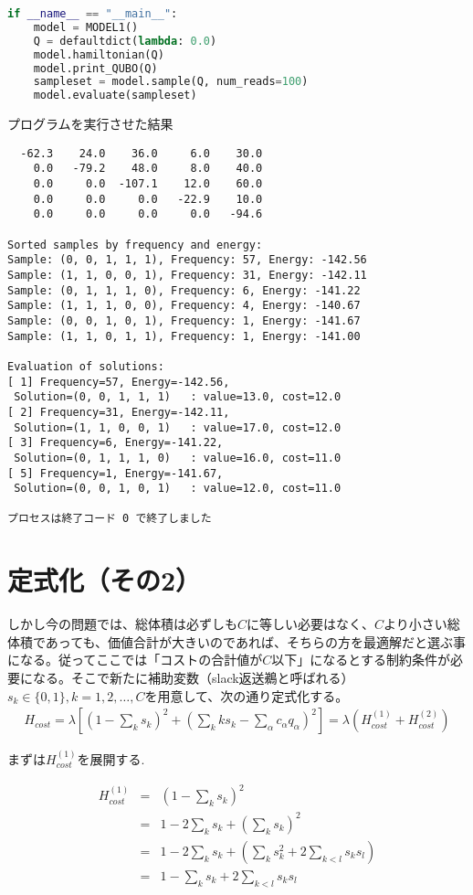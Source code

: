 \documentclass[uplatex,dvipdfmx,a4paper,11pt,oneside,openany]{jsbook}
\begin{document}
\begin{lstlisting}[language=Python]
if __name__ == "__main__":
    model = MODEL1()
    Q = defaultdict(lambda: 0.0)
    model.hamiltonian(Q)
    model.print_QUBO(Q)
    sampleset = model.sample(Q, num_reads=100)
    model.evaluate(sampleset)
\end{lstlisting}

プログラムを実行させた結果

\begin{verbatim}
  -62.3    24.0    36.0     6.0    30.0
    0.0   -79.2    48.0     8.0    40.0
    0.0     0.0  -107.1    12.0    60.0
    0.0     0.0     0.0   -22.9    10.0
    0.0     0.0     0.0     0.0   -94.6

Sorted samples by frequency and energy:
Sample: (0, 0, 1, 1, 1), Frequency: 57, Energy: -142.56
Sample: (1, 1, 0, 0, 1), Frequency: 31, Energy: -142.11
Sample: (0, 1, 1, 1, 0), Frequency: 6, Energy: -141.22
Sample: (1, 1, 1, 0, 0), Frequency: 4, Energy: -140.67
Sample: (0, 0, 1, 0, 1), Frequency: 1, Energy: -141.67
Sample: (1, 1, 0, 1, 1), Frequency: 1, Energy: -141.00

Evaluation of solutions:
[ 1] Frequency=57, Energy=-142.56,
 Solution=(0, 0, 1, 1, 1)	: value=13.0, cost=12.0
[ 2] Frequency=31, Energy=-142.11,
 Solution=(1, 1, 0, 0, 1)	: value=17.0, cost=12.0
[ 3] Frequency=6, Energy=-141.22,
 Solution=(0, 1, 1, 1, 0)	: value=16.0, cost=11.0
[ 5] Frequency=1, Energy=-141.67,
 Solution=(0, 0, 1, 0, 1)	: value=12.0, cost=11.0

プロセスは終了コード 0 で終了しました
\end{verbatim}

\section{定式化（その2）}

しかし今の問題では、総体積は必ずしも$C$に等しい必要はなく、$C$より小さい総体積であっても、価値合計が大きいのであれば、そちらの方を最適解だと選ぶ事になる。従ってここでは「コストの合計値が$C$以下」になるとする制約条件が必要になる。そこで新たに補助変数（slack返送鵜と呼ばれる）$s_k \in \{0, 1\}, k=1,2,\dots,C$を用意して、次の通り定式化する。
\begin{eqnarray}
  H_{cost} = \lambda \left[\left(1-\sum_k s_k\right)^2+\left(\sum_k ks_k - \sum_\alpha c_\alpha q_\alpha\right)^2\right] = \lambda\left(H_{cost}^{(1)} + H_{cost}^{(2)}\right)
\end{eqnarray}

まずは$H_{cost}^{(1)}$を展開する.

\begin{eqnarray*}
H_{cost}^{(1)}&=&\left(1-\sum_k s_k\right)^2\\
&=&1-2\sum_k s_k + \left(\sum_k s_k\right)^2\\
&=&1-2\sum_k s_k + \left(\sum_k s_k^2 + 2\sum_{k<l}s_k s_l\right)\\
&=&1-\sum_k s_k + 2\sum_{k<l}s_k s_l
\end{eqnarray*}
\end{document}
